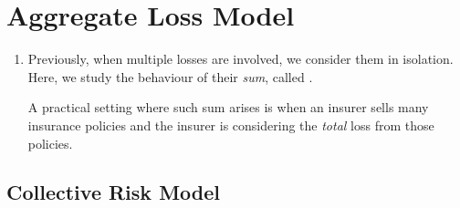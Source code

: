 \section{Aggregate Loss Model}
\label{sect:agg-loss-model}
\begin{enumerate}
\item Previously, when multiple losses are involved, we consider them in
isolation. Here, we study the behaviour of their \emph{sum}, called
.

A practical setting where such sum arises is when an insurer sells many
insurance policies and the insurer is considering the \emph{total} loss from
those policies.
\end{enumerate}
\subsection{Collective Risk Model}
